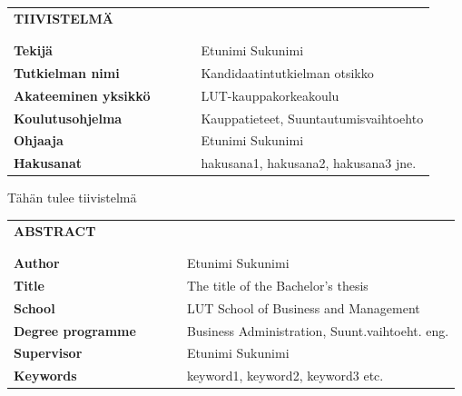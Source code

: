 \documentclass[a4paper,12pt]{article}
\begin{document}
\newpage
\noindent
\begin{table}[]
\begin{tabular}{lllll}
\textbf{TIIVISTELMÄ} \\
\\
\\
\textbf{Tekijä}              &  &  &  & Etunimi Sukunimi \\
\textbf{Tutkielman nimi}     &  &  &  & Kandidaatintutkielman otsikko \\
\textbf{Akateeminen yksikkö} &  &  &  & LUT-kauppakorkeakoulu \\
\textbf{Koulutusohjelma}     &  &  &  & Kauppatieteet, Suuntautumisvaihtoehto \\
\textbf{Ohjaaja}             &  &  &  & Etunimi Sukunimi \\
\textbf{Hakusanat}           &  &  &  & hakusana1, hakusana2, hakusana3 jne.                              \end{tabular}
\end{table}

\noindent Tähän tulee tiivistelmä

\newpage
\noindent
\begin{table}[]
\begin{tabular}{lllll}
\textbf{ABSTRACT} \\                                                                                    
\\                                                                                                  
\\
\textbf{Author}           &  &  &  & Etunimi Sukunimi \\
\textbf{Title}            &  &  &  & The title of the Bachelor’s thesis \\
\textbf{School}           &  &  &  & LUT School of Business and Management \\
\textbf{Degree programme} &  &  &  & Business Administration, Suunt.vaihtoeht. eng. \\
\textbf{Supervisor}       &  &  &  & Etunimi Sukunimi \\
\textbf{Keywords}         &  &  &  & keyword1, keyword2, keyword3 etc.
\end{tabular}
\end{table}
\end{document}
